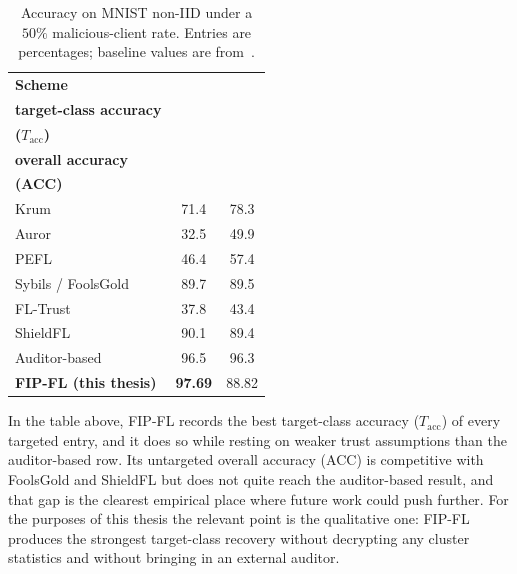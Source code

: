 \begin{table}[H]
\centering
\caption{Accuracy on MNIST non-IID under a $50\%$ malicious-client rate. Entries are percentages; baseline values are from~\cite{yazdinejad2024robust}.}
\label{tab:comp-accuracy}
\begin{tabular}{@{}lcc@{}}
\toprule
\textbf{Scheme} & \shortstack{\textbf{Targeted}\\\textbf{target-class accuracy}\\\textbf{($T_{\text{acc}}$)}} & \shortstack{\textbf{Untargeted}\\\textbf{overall accuracy}\\\textbf{(ACC)}} \\
\midrule
Krum~\cite{blanchard2017machine}              & 71.4 & 78.3 \\
Auror~\cite{shen2016auror}                    & 32.5 & 49.9 \\
PEFL~\cite{liu2021privacy}                    & 46.4 & 57.4 \\
Sybils / FoolsGold~\cite{fung2020limitations} & 89.7 & 89.5 \\
FL-Trust~\cite{cao2021fltrust}                & 37.8 & 43.4 \\
ShieldFL~\cite{ma2022shieldfl}                & 90.1 & 89.4 \\
Auditor-based~\cite{yazdinejad2024robust}     & 96.5 & 96.3 \\
\midrule
\textbf{FIP-FL (this thesis)}                 & \textbf{97.69} & 88.82 \\
\bottomrule
\end{tabular}
\end{table}

In the table above, FIP-FL records the best target-class accuracy ($T_{\text{acc}}$) of every targeted entry, and it does so while resting on weaker trust assumptions than the auditor-based row. Its untargeted overall accuracy (ACC) is competitive with FoolsGold and ShieldFL but does not quite reach the auditor-based result, and that gap is the clearest empirical place where future work could push further. For the purposes of this thesis the relevant point is the qualitative one: FIP-FL produces the strongest target-class recovery without decrypting any cluster statistics and without bringing in an external auditor.
